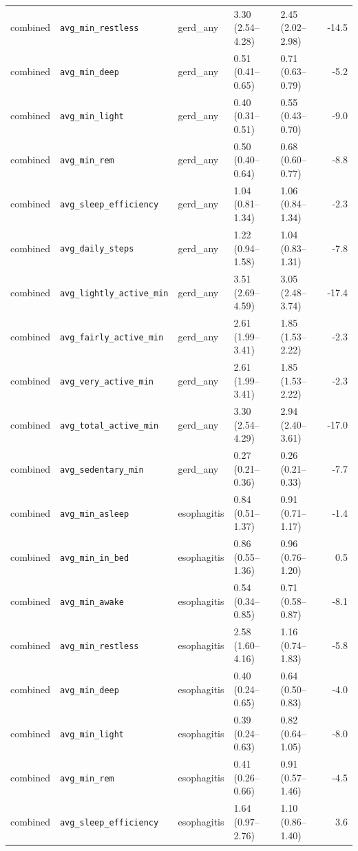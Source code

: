 \documentclass[11pt]{article}
\newcommand{\code}[1]{\texttt{\small #1}}
\begin{document}
\begin{longtable}{@{}p{1.7cm}p{3.0cm}p{1.9cm}p{2.6cm}p{2.6cm}r@{}}
combined & \code{avg\_min\_restless} & gerd\_any & 3.30 (2.54--4.28) & 2.45 (2.02--2.98) & -14.5 \\
combined & \code{avg\_min\_deep} & gerd\_any & 0.51 (0.41--0.65) & 0.71 (0.63--0.79) & -5.2 \\
combined & \code{avg\_min\_light} & gerd\_any & 0.40 (0.31--0.51) & 0.55 (0.43--0.70) & -9.0 \\
combined & \code{avg\_min\_rem} & gerd\_any & 0.50 (0.40--0.64) & 0.68 (0.60--0.77) & -8.8 \\
combined & \code{avg\_sleep\_efficiency} & gerd\_any & 1.04 (0.81--1.34) & 1.06 (0.84--1.34) & -2.3 \\
combined & \code{avg\_daily\_steps} & gerd\_any & 1.22 (0.94--1.58) & 1.04 (0.83--1.31) & -7.8 \\
combined & \code{avg\_lightly\_active\_min} & gerd\_any & 3.51 (2.69--4.59) & 3.05 (2.48--3.74) & -17.4 \\
combined & \code{avg\_fairly\_active\_min} & gerd\_any & 2.61 (1.99--3.41) & 1.85 (1.53--2.22) & -2.3 \\
combined & \code{avg\_very\_active\_min} & gerd\_any & 2.61 (1.99--3.41) & 1.85 (1.53--2.22) & -2.3 \\
combined & \code{avg\_total\_active\_min} & gerd\_any & 3.30 (2.54--4.29) & 2.94 (2.40--3.61) & -17.0 \\
combined & \code{avg\_sedentary\_min} & gerd\_any & 0.27 (0.21--0.36) & 0.26 (0.21--0.33) & -7.7 \\
combined & \code{avg\_min\_asleep} & esophagitis & 0.84 (0.51--1.37) & 0.91 (0.71--1.17) & -1.4 \\
combined & \code{avg\_min\_in\_bed} & esophagitis & 0.86 (0.55--1.36) & 0.96 (0.76--1.20) & 0.5 \\
combined & \code{avg\_min\_awake} & esophagitis & 0.54 (0.34--0.85) & 0.71 (0.58--0.87) & -8.1 \\
combined & \code{avg\_min\_restless} & esophagitis & 2.58 (1.60--4.16) & 1.16 (0.74--1.83) & -5.8 \\
combined & \code{avg\_min\_deep} & esophagitis & 0.40 (0.24--0.65) & 0.64 (0.50--0.83) & -4.0 \\
combined & \code{avg\_min\_light} & esophagitis & 0.39 (0.24--0.63) & 0.82 (0.64--1.05) & -8.0 \\
combined & \code{avg\_min\_rem} & esophagitis & 0.41 (0.26--0.66) & 0.91 (0.57--1.46) & -4.5 \\
combined & \code{avg\_sleep\_efficiency} & esophagitis & 1.64 (0.97--2.76) & 1.10 (0.86--1.40) & 3.6 \\

\end{longtable}
\end{document}
